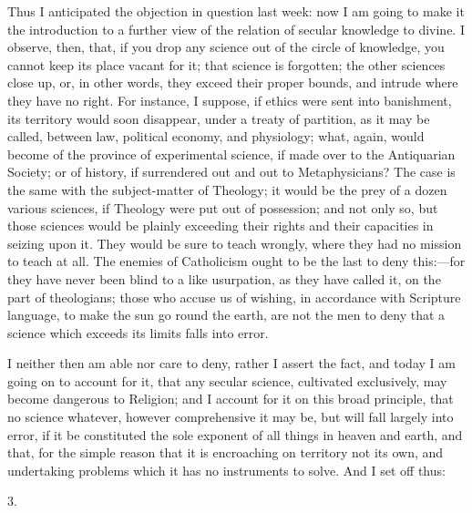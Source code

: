 Thus I anticipated the objection in question last week: now I am
going to make it the introduction to a further view of the relation of
secular knowledge to divine. I observe, then, that, if you drop any
science out of the circle of knowledge, you cannot keep its place
vacant for it; that science is forgotten; the other sciences close up,
or, in other words, they exceed their proper bounds, and intrude where
they have no right. For instance, I suppose, if ethics were sent into
banishment, its territory would soon disappear, under a treaty of
partition, as it may be called, between law, political economy, and
physiology; what, again, would become of the province of experimental
science, if made over to the Antiquarian Society; or of history, if
surrendered out and out to Metaphysicians? The case is the same with
the subject-matter of Theology; it would be the prey of a dozen
various sciences, if Theology were put out of possession; and not only
so, but those sciences would be plainly exceeding their rights and
their capacities in seizing upon it. They would be sure to teach
wrongly, where they had no mission to teach at all. The enemies of
Catholicism ought to be the last to deny this:—for they have never
been blind to a like usurpation, as they have called it, on the part
of theologians; those who accuse us of wishing, in accordance with
Scripture language, to make the sun go round the earth, are not the
men to deny that a science which exceeds its limits falls into error.

I neither then am able nor care to deny, rather I assert the fact,
and today I am going on to account for it, that any secular science,
cultivated exclusively, may become dangerous to Religion; and I
account for it on this broad principle, that no science whatever,
however comprehensive it may be, but will fall largely into error, if
it be constituted the sole exponent of all things in heaven and earth,
and that, for the simple reason that it is encroaching on territory
not its own, and undertaking problems which it has no instruments to
solve. And I set off thus:

3.

